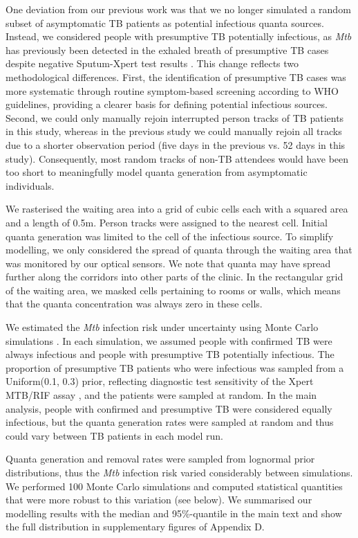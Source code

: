 \documentclass[11pt]{article}
\begin{document}
One deviation from our previous work was that we no longer simulated a random subset of asymptomatic TB patients as potential infectious quanta sources. Instead, we considered people with presumptive TB potentially infectious, as \emph{Mtb} has previously been detected in the exhaled breath of presumptive TB cases despite negative Sputum-Xpert test results \cite{patterson2024ProcNatlAcadSci}. This change reflects two methodological differences. First, the identification of presumptive TB cases was more systematic through routine symptom-based screening according to WHO guidelines, providing a clearer basis for defining potential infectious sources. Second, we could only manually rejoin interrupted person tracks of TB patients in this study, whereas in the previous study we could manually rejoin all tracks due to a shorter observation period (five days in the previous vs. 52 days in this study). Consequently, most random tracks of non-TB attendees would have been too short to meaningfully model quanta generation from asymptomatic individuals.

We rasterised the waiting area into a grid of cubic cells each with a squared area and a length of 0.5m. Person tracks were assigned to the nearest cell. Initial quanta generation was limited to the cell of the infectious source. To simplify modelling, we only considered the spread of quanta through the waiting area that was monitored by our optical sensors. We note that quanta may have spread further along the corridors into other parts of the clinic. In the rectangular grid of the waiting area, we masked cells pertaining to rooms or walls, which means that the quanta concentration was always zero in these cells.

We estimated the \emph{Mtb} infection risk under uncertainty using Monte Carlo simulations \cite{banholzer2025PLOSComputBiol,banholzer2024PLOSGlobalPublicHealth}. In each simulation, we assumed people with confirmed TB were always infectious and people with presumptive TB potentially infectious. The proportion of presumptive TB patients who were infectious was sampled from a Uniform(0.1, 0.3) prior, reflecting diagnostic test sensitivity of the Xpert MTB/RIF assay \cite{dorman2018LancetInfectDis}, and the patients were sampled at random. In the main analysis, people with confirmed and presumptive TB were considered equally infectious, but the quanta generation rates were sampled at random and thus could vary between TB patients in each model run.

Quanta generation and removal rates were sampled from lognormal prior distributions, thus the \emph{Mtb} infection risk varied considerably between simulations. We performed 100 Monte Carlo simulations and computed statistical quantities that were more robust to this variation (see below). We summarised our modelling results with the median and 95\%-quantile in the main text and show the full distribution in supplementary figures of Appendix D.
\end{document}
